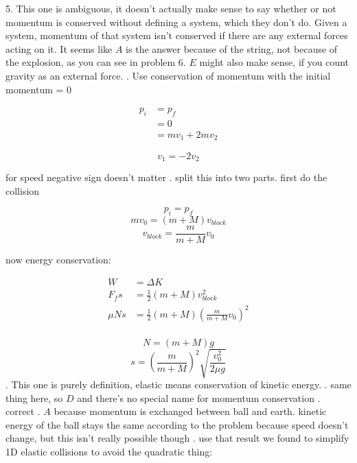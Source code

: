 \documentclass[]{article}
\begin{document}
5. This one is ambiguous, it doesn't actually make sense to say whether or not momentum is conserved without defining a system, which they don't do. Given a system, momentum of that system isn't conserved if there are any external forces acting on it. It seems like $A$ is the answer because of the string, not because of the explosion, as you can see in problem 6. $E$ might also make sense, if you count gravity as an external force. 
\newline
{}. Use conservation of momentum with the initial momentum = 0

\begin{align*}
p_i &= p_f \\
	&= 0 \\ 
	&= mv_1 +2mv_2
\end{align*} 

$$ v_1 = -2v_2$$

for speed negative sign doesn't matter
\newline
{}. split this into two parts. first do the collision

$$ p_i = p_f $$
$$ mv_0 = (m+M)v_{block} $$ 
$$ v_{block} = \frac{m}{m+M} v_0 $$

now energy conservation: 

\begin{align}
W &= \Delta K \\
F_f s &= \frac{1}{2}(m+M)v_{block}^2 \\
\mu N s &= \frac{1}{2}(m+M)\left(\frac{m}{m+M} v_0\right)^2 \\ 
\end{align}

$$ N = (m+M)g $$ 
$$ s = \left( \frac{m}{m+M} \right) ^2 \sqrt{\frac{v_0^2}{2\mu g}} $$
\newline
{}. This one is purely definition, elastic means conservation of kinetic energy. 
\newline
{}. same thing here, so $D$ and there's no special name for momentum conservation
\newline
{}. correct
\newline
{}. $A$ because momentum is exchanged between ball and earth. kinetic energy of the ball stays the same according to the problem because speed doesn't change, but this isn't really possible though
\newline
{}. use that result we found to simplify 1D elastic collisions to avoid the quadratic thing:
\end{document}
